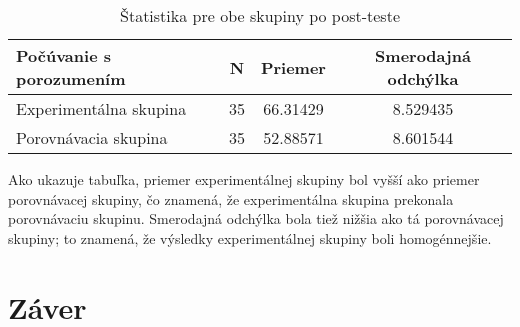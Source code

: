 \documentclass[10pt,oneside,slovak,a4paper]{article}
\begin{document}
\begin{table}[tbh]
\centering
\begin{tabular}{@{}|l|c|c|c|@{}}
\toprule
Počúvanie s porozumením & N  & Priemer  & Smerodajná odchýlka \\ \midrule
Experimentálna skupina  & 35 & 66.31429 & 8.529435            \\ \midrule
Porovnávacia skupina    & 35 & 52.88571 & 8.601544            \\ \bottomrule
\end{tabular}
\caption{\label{tab:Štatistika}Štatistika pre obe skupiny po post-teste}
\end{table}

Ako ukazuje tabuľka, priemer experimentálnej skupiny bol vyšší ako priemer porovnávacej skupiny, čo znamená, že experimentálna skupina prekonala porovnávaciu skupinu. Smerodajná odchýlka bola tiež nižšia ako tá porovnávacej skupiny; to znamená, že výsledky experimentálnej skupiny boli homogénnejšie.



\section{Záver} \label{zaver} %






\end{document}
